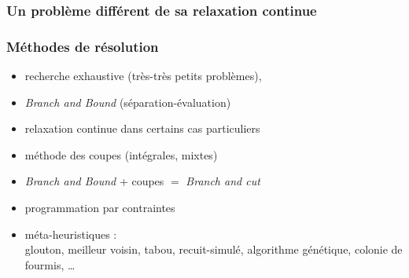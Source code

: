 \documentclass{beamer}
\begin{document}
\begin{frame}
  \frametitle{Un problème différent de sa relaxation continue}


\end{frame}

\begin{frame}
  \frametitle{Méthodes de résolution}

  \begin{itemize}
  \item recherche exhaustive (très-très petits problèmes),
  \item \emph{Branch and Bound} (séparation-évaluation)
  \item relaxation continue dans certains cas particuliers
  \item méthode des coupes (intégrales, mixtes)
  \item \emph{Branch and Bound} + coupes $=$ \emph{Branch and cut}
  \item programmation par contraintes
  \item méta-heuristiques : \\
      glouton, meilleur voisin, tabou, recuit-simulé, algorithme génétique, colonie de fourmis, \dots
  \end{itemize}
  
\end{frame}
\end{document}
